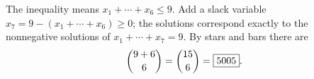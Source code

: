 The inequality means $x_1+\cdots+x_6\le9$. Add a slack variable $x_7=9-(x_1+\cdots+x_6)\ge0$; the solutions correspond exactly to the nonnegative solutions of $x_1+\cdots+x_7=9$. By stars and bars there are
\[
\dbinom{9+6}{6}=\dbinom{15}{6}=\boxed{5005}.
\]
